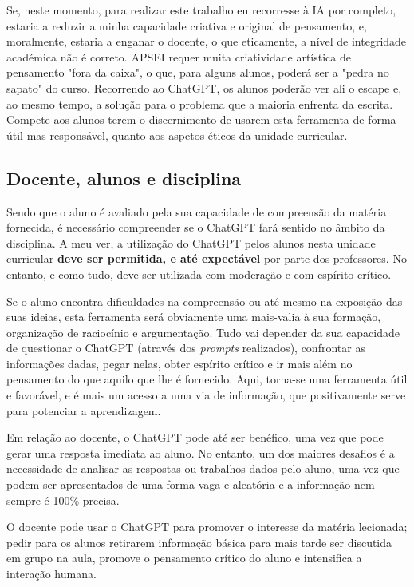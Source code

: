 \documentclass[portuguese, 11pt, a4paper, titlepage, oneside]{article}
\begin{document}
Se, neste momento, para realizar este trabalho eu recorresse à IA por completo, estaria a reduzir a minha capacidade criativa e original de pensamento, e, moralmente, estaria a enganar o docente, o que eticamente, a nível de integridade académica não é correto. APSEI requer muita criatividade artística de pensamento "fora da caixa", o que, para alguns alunos, poderá ser a "pedra no sapato" do curso. Recorrendo ao ChatGPT, os alunos poderão ver ali o escape e, ao mesmo tempo, a solução para o problema que a maioria enfrenta da escrita. Compete aos alunos terem o discernimento de usarem esta ferramenta de forma útil mas responsável, quanto aos aspetos éticos da unidade curricular.

\subsection{Docente, alunos e disciplina}
Sendo que o aluno é avaliado pela sua capacidade de compreensão da matéria fornecida, é necessário compreender se o ChatGPT fará sentido no âmbito da disciplina. A meu ver, a utilização do ChatGPT pelos alunos nesta unidade curricular \textbf{deve ser permitida, e até expectável} por parte dos professores. No entanto, e como tudo, deve ser utilizada com moderação e com espírito crítico.

Se o aluno encontra dificuldades na compreensão ou até mesmo na exposição das suas ideias, esta ferramenta será obviamente uma mais-valia à sua formação, organização de raciocínio e argumentação. Tudo vai depender da sua capacidade de questionar o ChatGPT (através dos \textit{prompts} realizados), confrontar as informações dadas, pegar nelas, obter espírito crítico e ir mais além no pensamento do que aquilo que lhe é fornecido. Aqui, torna-se uma ferramenta útil e favorável, e é mais um acesso a uma via de informação, que positivamente serve para potenciar a aprendizagem.

Em relação ao docente, o ChatGPT pode até ser benéfico, uma vez que pode gerar uma resposta imediata ao aluno. No entanto, um dos maiores desafios é a necessidade de analisar as respostas ou trabalhos dados pelo aluno, uma vez que podem ser apresentados de uma forma vaga e aleatória e a informação nem sempre é 100\% precisa.

O docente pode usar o ChatGPT para promover o interesse da matéria lecionada; pedir para os alunos retirarem informação básica para mais tarde ser discutida em grupo na aula, promove o pensamento crítico do aluno e intensifica a interação humana.
\end{document}
